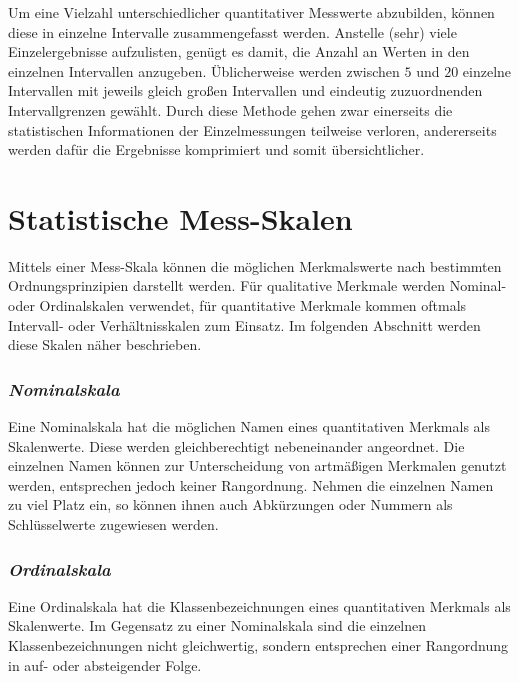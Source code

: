 \documentclass[a4paper]{article}
\providecommand*{\DUrubric}[2][class-arg]{%
  \subsubsection*{\centering\textit{\textmd{#2}}}}
\begin{document}



Um eine Vielzahl unterschiedlicher quantitativer Messwerte abzubilden, können
diese in einzelne Intervalle zusammengefasst werden. Anstelle (sehr) viele
Einzelergebnisse aufzulisten, genügt es damit, die Anzahl an Werten in den
einzelnen Intervallen anzugeben. Üblicherweise werden zwischen $5$ und
$20$ einzelne Intervallen mit jeweils gleich großen Intervallen und
eindeutig zuzuordnenden Intervallgrenzen gewählt. Durch diese Methode gehen zwar
einerseits die statistischen Informationen der Einzelmessungen teilweise
verloren, andererseits werden dafür die Ergebnisse \textquotedbl{}komprimiert\textquotedbl{} und somit
übersichtlicher.



\section{Statistische Mess-Skalen%
  \label{id3}%
  \label{statistische-mess-skalen}%
}

Mittels einer Mess-Skala können die möglichen Merkmalswerte nach bestimmten
Ordnungsprinzipien darstellt werden. Für qualitative Merkmale werden Nominal-
oder Ordinalskalen verwendet, für quantitative Merkmale kommen oftmals
Intervall- oder Verhältnisskalen zum Einsatz. Im folgenden Abschnitt werden
diese Skalen näher beschrieben.

\DUrubric{Nominalskala}

Eine Nominalskala hat die möglichen Namen eines quantitativen Merkmals als
Skalenwerte. Diese werden gleichberechtigt nebeneinander angeordnet. Die
einzelnen Namen können zur Unterscheidung von artmäßigen Merkmalen genutzt
werden, entsprechen jedoch keiner Rangordnung. Nehmen die einzelnen
Namen zu viel Platz ein, so können ihnen auch Abkürzungen oder Nummern als
Schlüsselwerte zugewiesen werden.




\DUrubric{Ordinalskala}

Eine Ordinalskala hat die Klassenbezeichnungen eines quantitativen Merkmals als
Skalenwerte. Im Gegensatz zu einer Nominalskala sind die einzelnen
Klassenbezeichnungen nicht gleichwertig, sondern entsprechen einer Rangordnung
in auf- oder absteigender Folge.
\end{document}
